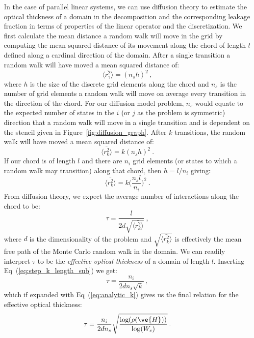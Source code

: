 \documentclass[preprint,11pt]{elsarticle}
\begin{document}
In the case of parallel linear systems, we can use diffusion theory to
estimate the optical thickness of a domain in the decomposition and the
corresponding leakage fraction in terms of properties of the linear operator
and the discretization. We first calculate the mean distance a random walk
will move in the grid by computing the mean squared distance of its movement
along the chord of length $l$ defined along a cardinal direction of the
domain. After a single transition a random walk will have moved a mean squared
distance of:
\begin{equation}
  \langle \bar{r_1^2} \rangle = (n_s h)^2\:,
  \label{eq:step_1_length}
\end{equation}
where $h$ is the size of the discrete grid elements along the chord and $n_s$
is the number of grid elements a random walk will move on average every
transition in the direction of the chord. For our diffusion model problem,
$n_s$ would equate to the expected number of states in the $i$ (or $j$ as the
problem is symmetric) direction that a random walk will move in a single
transition and is dependent on the stencil given in
Figure~\ref{fig:diffusion_graph}. After $k$ transitions, the random walk will
have moved a mean squared distance of:
\begin{equation}
  \langle \bar{r_k^2} \rangle = k (n_s h)^2\:.
  \label{eq:step_k_length}
\end{equation}
If our chord is of length $l$ and there are $n_i$ grid elements (or
states to which a random walk may transition) along that chord, then $h =
l / n_i$ giving:
\begin{equation}
  \langle \bar{r_k^2} \rangle = k \Bigg(\frac{n_s l}{n_i}\Bigg)^2\:.
  \label{eq:step_k_length_sub}
\end{equation}
From diffusion theory, we expect the average number of interactions
along the chord to be:
\begin{equation}
  \tau = \frac{l}{2 d \sqrt{\langle \bar{r_k^2} \rangle}}\:,
  \label{eq:optical_thickness_1}
\end{equation}
where $d$ is the dimensionality of the problem and $\sqrt{\langle
  \bar{r_k^2} \rangle}$ is effectively the mean free path of the Monte
Carlo random walk in the domain. We can readily interpret $\tau$ to be the
\textit{effective optical thickness} of a domain of length
$l$. Inserting Eq~(\ref{eq:step_k_length_sub}) we get:
\begin{equation}
  \tau = \frac{n_i}{2 d n_s \sqrt{k}}\:,
  \label{eq:optical_thickness_2}
\end{equation}
which if expanded with Eq~(\ref{eq:analytic_k}) gives us the final
relation for the effective optical thickness:
\begin{equation}
  \tau = \frac{n_i}{2 d n_s}
  \sqrt{\frac{\log(\rho(\ve{H}))}{\log(W_c)}}\:.
  \label{eq:optical_thickness_3}
\end{equation}
\end{document}
